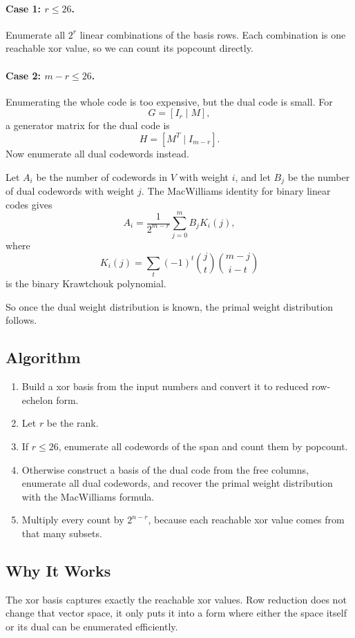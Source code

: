 \paragraph{Case 1: \(r \le 26\).}
Enumerate all \(2^r\) linear combinations of the basis rows. Each combination is one reachable xor value, so we can count its popcount directly.

\paragraph{Case 2: \(m-r \le 26\).}
Enumerating the whole code is too expensive, but the dual code is small. For
\[
G = [I_r \mid M],
\]
a generator matrix for the dual code is
\[
H = [M^T \mid I_{m-r}].
\]
Now enumerate all dual codewords instead.

Let \(A_i\) be the number of codewords in \(V\) with weight \(i\), and let \(B_j\) be the number of dual codewords with weight \(j\). The MacWilliams identity for binary linear codes gives
\[
A_i = \frac{1}{2^{m-r}} \sum_{j=0}^{m} B_j K_i(j),
\]
where
\[
K_i(j) = \sum_t (-1)^t \binom{j}{t}\binom{m-j}{i-t}
\]
is the binary Krawtchouk polynomial.

So once the dual weight distribution is known, the primal weight distribution follows.

\subsection{Algorithm}
\begin{enumerate}
\item Build a xor basis from the input numbers and convert it to reduced row-echelon form.
\item Let \(r\) be the rank.
\item If \(r \le 26\), enumerate all codewords of the span and count them by popcount.
\item Otherwise construct a basis of the dual code from the free columns, enumerate all dual codewords, and recover the primal weight distribution with the MacWilliams formula.
\item Multiply every count by \(2^{n-r}\), because each reachable xor value comes from that many subsets.
\end{enumerate}

\subsection{Why It Works}
The xor basis captures exactly the reachable xor values. Row reduction does not change that vector space, it only puts it into a form where either the space itself or its dual can be enumerated efficiently.

